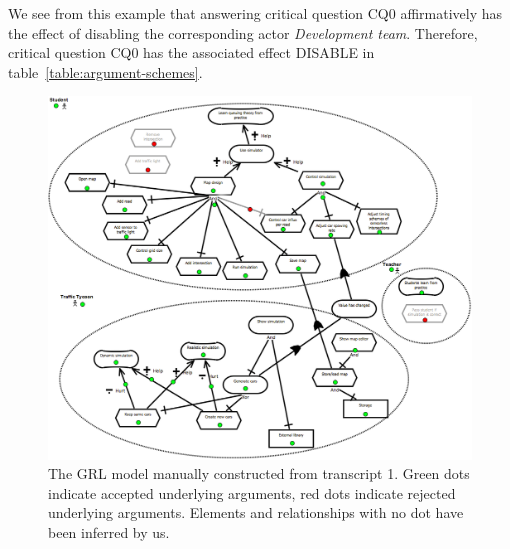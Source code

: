 We see from this example that answering critical question CQ0 affirmatively has the effect of disabling the corresponding actor \emph{Development team}. Therefore, critical question CQ0 has the associated effect DISABLE in table~\ref{table:argument-schemes}.

\begin{figure}[h]
\includegraphics[width=\textwidth]{img/transcript_grl}
\caption{The GRL model manually constructed from transcript 1. Green dots indicate accepted underlying arguments, red dots indicate rejected underlying arguments. Elements and relationships with no dot have been inferred by us.}
\label{fig:transcripts:grl}
\end{figure}